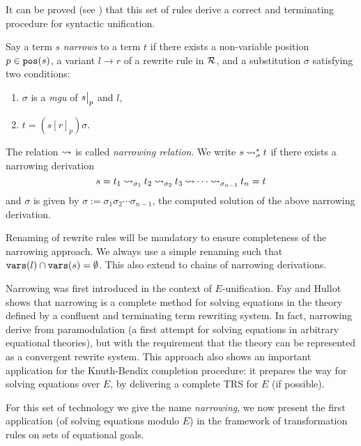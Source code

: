 It can be proved (see \cite{DBLP:books/el/RV01/BaaderS01}) that this set of rules derive a correct and terminating procedure for syntactic unification.

\begin{definition}\label{definition:narrow}
	Say a term $s$ \textit{narrows} to a term $t$ if there exists a non-variable position $p \in \mathtt{pos}(s)$, a variant $l \rightarrow r$ of a rewrite rule in $\mathcal{R}$, and a substitution $\sigma$ satisfying two conditions:
	\begin{enumerate}
		\item $\sigma$ is a \textit{mgu} of $\restr{s}{p}$ and $l$,
		\item $t = \left( s[r]_{p} \right)\sigma$.
	\end{enumerate}
\end{definition}

The relation $\mathbin{\rightsquigarrow}$ is called \textit{narrowing relation}. We write $s \mathbin{\rightsquigarrow}_{\sigma}^{*} t$ if there exists a narrowing derivation
$$s = t_1 \mathbin{\rightsquigarrow}_{\sigma_1} t_2 \mathbin{\rightsquigarrow}_{\sigma_2} t_3 \mathbin{\rightsquigarrow} \cdots \mathbin{\rightsquigarrow}_{\sigma_{n-1}}t_n = t$$
and $\sigma$ is given by $\sigma := \sigma_1\sigma_2 \cdots \sigma_{n-1}$, the computed solution of the above narrowing derivation.

\begin{remark}
	Renaming of rewrite rules will be mandatory to ensure completeness of the narrowing approach. We always use a simple renaming such that $\mathtt{vars}(l) \cap \mathtt{vars}(s) = \emptyset$. This also extend to chains of narrowing derivations.
\end{remark}

Narrowing was first introduced in the context of $E$-unification. Fay \cite{fay1978first} and Hullot \cite{hullot:cfunif} shows that narrowing is a complete method for solving equations in the theory defined by a confluent and terminating term rewriting system. In fact, narrowing derive from paramodulation (a first attempt for solving equations in arbitrary equational theories), but with the requirement that the theory can be represented as a convergent rewrite system. This approach also shows an important application for the Knuth-Bendix completion procedure: it prepares the way for solving equations over $E$, by delivering a complete TRS for $E$ (if possible).

For this set of technology we give the name \textit{narrowing}, we now present the first application (of solving equations modulo $E$) in the framework of transformation rules on sets of equational goals.

